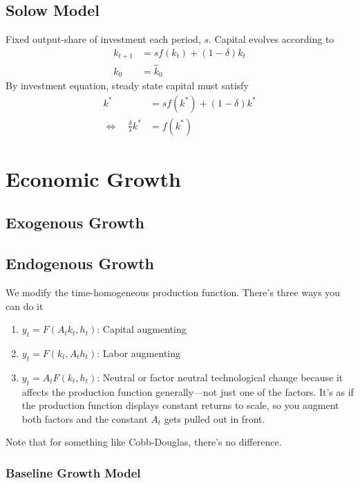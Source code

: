 \documentclass[12pt]{article}
\theoremstyle{plain}
\theoremstyle{definition}
\theoremstyle{remark}
\begin{document}
\clearpage
\subsection{Solow Model}

Fixed output-share of investment each period, $s$. Capital evolves
according to
\begin{align*}
  k_{t+1} &= sf(k_t) + (1-\delta)k_t \\
  k_0 &= \hat{k}_0
\end{align*}
By investment equation, steady state capital must satisfy
\begin{align*}
  k^* &= sf(k^*) + (1-\delta)k^*\\
  \Leftrightarrow\quad
  \frac{\delta}{s} k^* &= f(k^*)
\end{align*}



\clearpage
\section{Economic Growth}

\subsection{Exogenous Growth}

\subsection{Endogenous Growth}

We modify the time-homogeneous production function. There's three ways
you can do it
\begin{enumerate}
  \item $y_t = F(A_t k_t,h_t)$: Capital augmenting
  \item $y_t = F(k_t,A_t h_t)$: Labor augmenting
  \item $y_t = A_t F(k_t,h_t)$: Neutral or factor neutral technological
    change because it affects the production function generally---not
    just one of the factors. It's as if the production function displays
    constant returns to scale, so you augment both factors and the
    constant $A_t$ gets pulled out in front.
\end{enumerate}
Note that for something like Cobb-Douglas, there's no difference.

\subsubsection{Baseline Growth Model}
\end{document}
